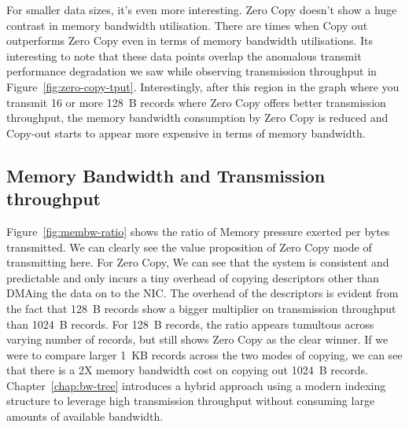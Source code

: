 For smaller data sizes, it's even more interesting. Zero Copy doesn't show a huge contrast in memory bandwidth utilisation. There are times 
when Copy out outperforms Zero Copy even in terms of memory bandwidth utilisations. Its interesting to note that these data points overlap the anomalous transmit performance 
degradation we saw while observing transmission throughput in Figure~\ref{fig:zero-copy-tput}. Interestingly, after this region in the graph 
where you transmit 16 or more 128~B records where Zero Copy offers better transmission throughput, the memory bandwidth consumption by Zero Copy 
is reduced and Copy-out starts to appear more expensive in terms of memory bandwidth. 


\subsection{Memory Bandwidth and Transmission throughput}
\label{sec:membw-savings}

Figure~\ref{fig:membw-ratio} shows the ratio of Memory pressure exerted per bytes transmitted. We can clearly see the value proposition of 
Zero Copy mode of transmitting here. For Zero Copy, We can see that the system is consistent and predictable and only incurs a tiny overhead of 
copying descriptors other than DMAing the data on to the NIC. The overhead of the descriptors is evident from the fact that 128~B records show 
a bigger multiplier on transmission throughput than 1024~B records. For 128~B records, the ratio appears tumultous across varying number of records, 
 but still shows Zero Copy as the clear winner. If we were to compare larger 1~KB records across the two modes of copying, we can see that there is a 
 2X memory bandwidth cost on copying out 1024~B records. Chapter~\ref{chap:bw-tree} introduces a hybrid approach using a modern indexing structure to leverage 
 high transmission throughput without consuming large amounts of available bandwidth.



